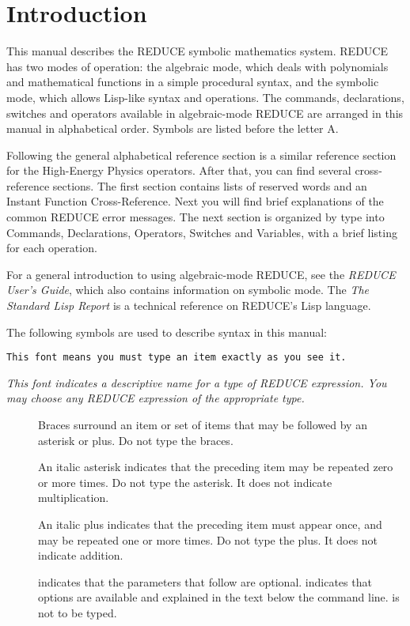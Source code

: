 \section{Introduction}

This manual describes the REDUCE symbolic mathematics system.  REDUCE has
two modes of operation: the algebraic mode, which deals with polynomials
and mathematical functions in a simple procedural syntax, and the symbolic
mode, which allows Lisp-like syntax and operations.  The commands,
declarations, switches and operators available in algebraic-mode REDUCE
are arranged in this manual in alphabetical order.  Symbols are listed
before the letter A.

Following the general alphabetical reference section is a similar
reference section for the High-Energy Physics operators.  After that, you
can find several cross-reference sections.  The first section contains
lists of reserved words and an Instant Function Cross-Reference.  Next you
will find brief explanations of the common REDUCE error messages.  The
next section is organized by type into Commands, Declarations, Operators,
Switches and Variables, with a brief listing for each operation.

For a general introduction to using algebraic-mode REDUCE, see the {\em
REDUCE User's Guide}, which also contains information on symbolic mode.
The {\em The Standard Lisp Report} is a technical reference on REDUCE's
Lisp language.

The following symbols are used to describe syntax in this manual:

\begin{verbatim}
This font means you must type an item exactly as you see it.
\end{verbatim}

{\em This font indicates a descriptive name for a type of REDUCE expression.
You may choose any REDUCE expression of the appropriate type.}

\begin{description}
\item[\meta{\{\}}]
Braces surround an item or set of items that may be followed by an
asterisk or plus.  Do not type the braces.

\item[\meta{*}]
An italic asterisk indicates that the preceding item may be repeated zero or 
more times. Do not type the asterisk.  It does not indicate multiplication.

\item[\meta{+}]
An italic plus indicates that the preceding item must appear once, and may be 
repeated one or more times.  Do not type the plus.  It does not indicate
addition.

\item[]
 indicates that the parameters that follow are optional.
 indicates that options are available and explained in the
text below the command line.   is not to be typed.
\end{description}

